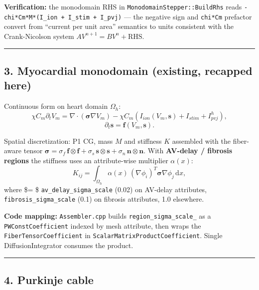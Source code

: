 \documentclass[
  11pt,
]{article}
\begin{document}
\textbf{Verification:} the monodomain RHS in
\texttt{MonodomainStepper::BuildRhs} reads
\texttt{-chi*Cm*M*(I\_ion\ +\ I\_stim\ +\ I\_pvj)} --- the negative sign
and \texttt{chi*Cm} prefactor convert from ``current per unit area''
semantics to units consistent with the Crank-Nicolson system
\(A V^{n+1} = B V^n + \mathrm{RHS}\).

\begin{center}\rule{0.5\linewidth}{0.5pt}\end{center}

\hypertarget{myocardial-monodomain-existing-recapped-here}{%
\subsection{3. Myocardial monodomain (existing, recapped
here)}\label{myocardial-monodomain-existing-recapped-here}}

Continuous form on heart domain \(\Omega_h\):
\[\chi C_m \partial_t V_m = \nabla\cdot(\boldsymbol\sigma \nabla V_m) - \chi C_m (I_{ion}(V_m, \mathbf{s}) + I_{stim} + I_{pvj}^h),\]
\[\partial_t \mathbf{s} = \mathbf{f}(V_m, \mathbf{s}).\]

Spatial discretization: P1 CG, mass \(M\) and stiffness \(K\) assembled
with the fiber-aware tensor
\(\boldsymbol\sigma = \sigma_f\, \mathbf{f}\!\otimes\!\mathbf{f} + \sigma_s\, \mathbf{s}\!\otimes\!\mathbf{s} + \sigma_n\, \mathbf{n}\!\otimes\!\mathbf{n}\).
With \textbf{AV-delay / fibrosis regions} the stiffness uses an
attribute-wise multiplier \(\alpha(x)\):
\[K_{ij} = \int_{\Omega_h} \alpha(x)\, (\nabla\phi_i)^T \boldsymbol\sigma \nabla\phi_j\,\mathrm{d}x,\]
where \$\alpha = \$ \texttt{av\_delay\_sigma\_scale} (0.02) on AV-delay
attributes, \texttt{fibrosis\_sigma\_scale} (0.1) on fibrosis
attributes, 1.0 elsewhere.

\textbf{Code mapping:} \texttt{Assembler.cpp} builds
\texttt{region\_sigma\_scale\_} as a \texttt{PWConstCoefficient} indexed
by mesh attribute, then wraps the \texttt{FiberTensorCoefficient} in
\texttt{ScalarMatrixProductCoefficient}. Single DiffusionIntegrator
consumes the product.

\begin{center}\rule{0.5\linewidth}{0.5pt}\end{center}

\hypertarget{purkinje-cable}{%
\subsection{4. Purkinje cable}\label{purkinje-cable}}
\end{document}

